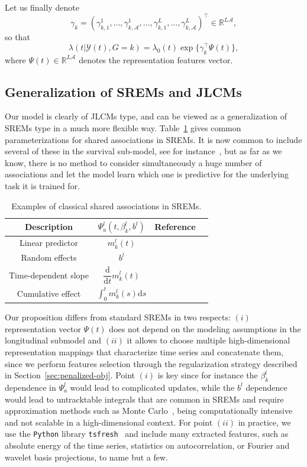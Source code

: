 \documentclass[11pt]{article}
\newcommand{\dd}{\mathrm{d}}
\newcommand{\cY}{\mathcal Y}
\newcommand{\cA}{\mathcal A}
\newcommand{\R}{\mathds R}
\begin{document}
Let us finally denote
\[\gamma_k= (\gamma_{k,1}^1, \ldots, \gamma_{k,\cA}^1, \ldots, \gamma_{k,1}^L, \ldots, \gamma_{k,\cA}^L )^\top \in \R^{L\cA}, \] so that
\begin{equation}
  \label{eq:def-asso-features}
  \lambda(t|\cY(t), G = k) = \lambda_0(t) \exp \big\{\gamma_k^\top \Psi(t) \big\},
\end{equation}
where $\Psi(t) \in \R^{L\cA}$ denotes the representation features vector.

\subsection{Generalization of SREMs and JLCMs}
 
Our model is clearly of JLCMs type, and can be viewed as a generalization of SREMs type in a much more flexible way. Table~\ref{table:shared_associations} gives common parameterizations for shared associations in SREMs. It is now common to include several of these in the survival sub-model, see for instance~\citet{andrinopoulou2016bayesian, ferrer2016joint}, but as far as we know, there is no method to consider simultaneously a huge number of associations and let the model learn which one is predictive for the underlying task it is trained for.
\begin{table}[htb]
\centering
\begin{tabular}{cccc}
\toprule
Description & $\Psi_a^l(t, \beta_k^l, b^l)$  & Reference \\
\midrule
Linear predictor & $m_k^l(t)$ & \citet{chi2006joint} \\ [.15cm]
Random effects & $b^l$  & \citet{hatfield2011joint} \\
Time-dependent slope & $\dfrac{\dd}{\dd t} m_k^l(t)$ & \citet{rizopoulos2011bayesian} \\ [.3cm]
Cumulative effect & $\int_0^t m_k^l(s) \dd s$ & \citet{andrinopoulou2017combined} \\ [.1cm]
 \bottomrule
\end{tabular}
\caption[]{Examples of classical shared associations in SREMs.}
\label{table:shared_associations}
\end{table}

Our proposition differs from standard SREMs in two respects: $(i)$ representation vector $\Psi(t)$ does not depend on the modeling assumptions in the longitudinal submodel and $(ii)$ it allows to choose multiple high-dimensional representation mappings that characterize time series and concatenate them, since we perform features selection through the regularization strategy described in Section~\ref{sec:penalized-obj}. Point $(i)$ is key since for instance the $\beta_k^l$ dependence in $\Psi_a^l$ would lead to complicated updates, while the $b^l$ dependence would lead to untracktable integrals that are common in SREMs and require approximation methods such as Monte Carlo~\citep{hickey2018joinerml}, being computationally intensive and not scalable in a high-dimensional context. For point $(ii)$ in practice, we use the \texttt{Python} library \texttt{tsfresh}~\citep{christ2018time} and include many extracted features, such as absolute energy of the time series, statistics on autocorrelation, or Fourier and wavelet basis projections, to name but a few.
\end{document}
